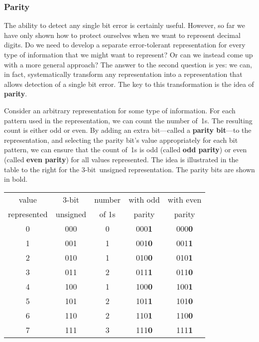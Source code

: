 \subsubsection{Parity}

The ability to detect any single bit error is certainly useful.
However, so far we have only shown how to protect ourselves when we
want to represent decimal digits.  Do we need to develop a separate
error-tolerant representation for every type of information that
we might want to represent?  Or can we instead come up with a more
general approach?
%
The answer to the second question is yes: we can, in fact, systematically
transform any representation into a representation that allows detection of a
single bit error.  The key to this transformation is the idea of
{\bf parity}.\vspace{2pt}

\begin{minipage}{2.6in}
Consider an arbitrary representation for some type of information.
For each pattern used in the representation, we can count the number
of~1s.  The resulting count is either odd or even.  By adding an extra
bit---called a {\bf parity bit}---to the representation, and 
selecting the parity bit's value 
appropriately for each bit pattern, we can ensure that the count of~1s
is odd (called {\bf odd parity}) or even (called {\bf even parity})
for all values represented.  The idea is
%
illustrated in the table
to the right for the \mbox{3-bit}~unsigned representation.  The parity
bits are shown in bold.\vspace{2pt}
\end{minipage}\hspace{.25in}%
\begin{minipage}{3.65in}
\begin{tabular}{c|c|c|c|c}
value      &   3-bit & number& with odd& with even \\
represented& unsigned& of 1s & parity  & parity \\ \hline
0& 000& 0& 000{\bf 1}& 000{\bf 0}\\
1& 001& 1& 001{\bf 0}& 001{\bf 1}\\
2& 010& 1& 010{\bf 0}& 010{\bf 1}\\
3& 011& 2& 011{\bf 1}& 011{\bf 0}\\
4& 100& 1& 100{\bf 0}& 100{\bf 1}\\
5& 101& 2& 101{\bf 1}& 101{\bf 0}\\
6& 110& 2& 110{\bf 1}& 110{\bf 0}\\
7& 111& 3& 111{\bf 0}& 111{\bf 1}\\
\end{tabular}
\end{minipage}\vspace{2pt}

